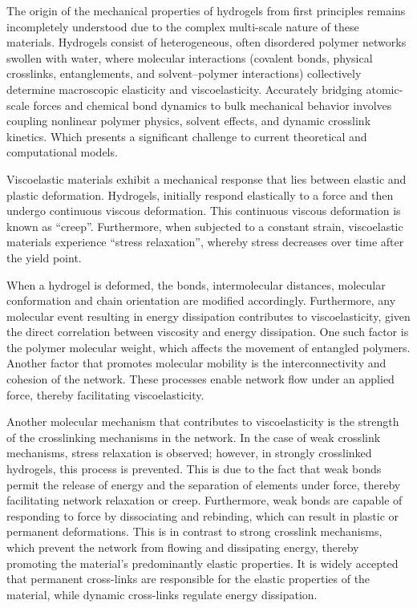 The origin of the mechanical properties of hydrogels from first principles remains incompletely understood due to the complex multi-scale nature of these materials\citep{senffTemperatureSensitiveMicrogel1999}.
Hydrogels consist of heterogeneous, often disordered polymer networks swollen with water, where molecular interactions (covalent bonds, physical crosslinks, entanglements, and solvent–polymer interactions) collectively determine macroscopic elasticity and viscoelasticity. 
Accurately bridging atomic-scale forces and chemical bond dynamics to bulk mechanical behavior involves coupling nonlinear polymer physics, solvent effects, and dynamic crosslink kinetics. 
Which presents a significant challenge to current theoretical and computational models. 

Viscoelastic materials exhibit a mechanical response that lies between elastic and plastic deformation.
Hydrogels, initially respond elastically to a force and then undergo continuous viscous deformation.
This continuous viscous deformation is known as ``creep''.
Furthermore, when subjected to a constant strain, viscoelastic materials experience ``stress relaxation'', whereby stress decreases over time after the yield point.

When a hydrogel is deformed, the bonds, intermolecular distances, molecular conformation and chain orientation are modified accordingly.
Furthermore, any molecular event resulting in energy dissipation contributes to viscoelasticity, given the direct correlation between viscosity and energy dissipation.
One such factor is the polymer molecular weight, which affects the movement of entangled polymers.
Another factor that promotes molecular mobility is the interconnectivity and cohesion of the network.
These processes enable network flow under an applied force, thereby facilitating viscoelasticity.

Another molecular mechanism that contributes to viscoelasticity is the strength of the crosslinking mechanisms in the network.
In the case of weak crosslink mechanisms, stress relaxation is observed; however, in strongly crosslinked hydrogels, this process is prevented. 
This is due to the fact that weak bonds permit the release of energy and the separation of elements under force, thereby facilitating network relaxation or creep.
Furthermore, weak bonds are capable of responding to force by dissociating and rebinding, which can result in plastic or permanent deformations.
This is in contrast to strong crosslink mechanisms, which prevent the network from flowing and dissipating energy, thereby promoting the material's predominantly elastic properties.
It is widely accepted that permanent cross-links are responsible for the elastic properties of the material, while dynamic cross-links regulate energy dissipation.

